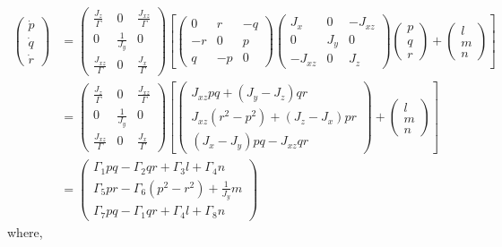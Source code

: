 \begin{equation}\label{eq:body_rate_derivation}
\begin{split}
 \begin{pmatrix}
  \dot{p} \\
  \dot{q} \\
  \dot{r} 
 \end{pmatrix}
 &=
 \begin{pmatrix}
 \frac{J_z}{\Gamma} & 0 & \frac{J_{xz}}{\Gamma}\\
 0 & \frac{1}{J_y} & 0\\
 \frac{J_{xz}}{\Gamma} & 0 & \frac{J_x}{\Gamma}
 \end{pmatrix}
 \left[
 \begin{pmatrix}
  0& r& -q \\
  -r& 0& p \\
  q& -p& 0
 \end{pmatrix}
 \begin{pmatrix}
 J_x & 0 & -J_{xz}\\
 0 & J_y & 0\\
 -J_{xz} & 0 & J_z
 \end{pmatrix}
 \begin{pmatrix}
  p\\
  q\\
  r
 \end{pmatrix} +
 \begin{pmatrix}
  l\\
  m\\
  n
 \end{pmatrix}
 \right] \\ 
 &=
 \begin{pmatrix}
  \frac{J_z}{\Gamma} & 0 & \frac{J_{xz}}{\Gamma}\\
  0 & \frac{1}{J_y} & 0\\
  \frac{J_{xz}}{\Gamma} & 0 & \frac{J_x}{\Gamma}
 \end{pmatrix}
 \left[
 \begin{pmatrix}
 J_{xz}pq+(J_y-J_z)qr\\
 J_{xz}(r^2-p^2)+(J_z-J_x)pr\\
 (J_x-J_y)pq-J_{xz}qr
 \end{pmatrix}+
 \begin{pmatrix}
  l\\
  m\\
  n
 \end{pmatrix}
 \right]\\ 
 &=
 \begin{pmatrix}
  \Gamma_1pq-\Gamma_2qr+\Gamma_3l+\Gamma_4n\\
  \Gamma_5pr-\Gamma_6(p^2-r^2)+\frac{1}{J_y}m\\
  \Gamma_7pq-\Gamma_1qr+\Gamma_4l+\Gamma_8n
 \end{pmatrix}
 \end{split}  
\end{equation}
where,


